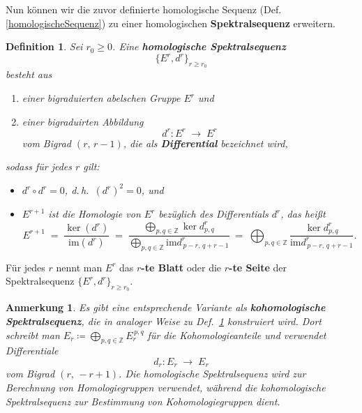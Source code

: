 \documentclass[12pt]{article}
\numberwithin{conj}{section}
\newtheorem{definition}[conj]{Definition}
\newtheorem{remark}[conj]{Anmerkung}
\newcommand{\Z}{\mathbb{Z}}
\begin{document}
    Nun können wir die zuvor definierte homologische Sequenz (Def. \ref{homologischeSequenz})
    zu einer homologischen \textbf{Spektralsequenz} erweitern.

    \begin{definition}
        \label{homologischeSpektraleSequenz} Sei $r_{0} \geq 0$. Eine \textbf{homologische
        Spektralsequenz}
        \[
            \{E^{r},d^{r}\}_{r \geq r_0}
        \]
        besteht aus
        \begin{enumerate}[nolistsep]
            \item einer bigraduierten abelschen Gruppe $E^{r}$ und

            \item einer bigraduirten Abbildung
                \[
                    d^{r} : E^{r} \;\longrightarrow\; E^{r}
                \]
                vom Bigrad $(r,\,r-1)$, die als \textbf{Differential} bezeichnet wird,
        \end{enumerate}
        sodass für jedes $r$ gilt:
        \begin{itemize}[nolistsep]
            \item $d^{r} \circ d^{r} = 0$, d.\,h.\ $(d^{r})^{2} = 0$, und

            \item $E^{r+1}$ ist die Homologie von $E^{r}$ bezüglich des Differentials $d
                ^{r}$, das heißt
                \[
                    E^{r+1}\;=\; \frac{\ker(d^{r})}{\mathrm{im}(d^{r})}\;=\; \frac{\displaystyle\bigoplus_{p,q
                    \in \Z}\ker d^{r}_{p,q} }%
                    {\displaystyle\bigoplus_{p,q \in \Z} \mathrm{im}\! d^r_{\,p-r,\,q+r-1} }
                    \;=\; \bigoplus_{p,q \in \Z}\frac{\ker d^{r}_{p,q} }{\mathrm{im}\! d^{r}_{\,p-r,\,q+r-1} }
                    .
                \]
        \end{itemize}
    \end{definition}

    Für jedes $r$ nennt man $E^{r}$ das \textbf{$r$-te Blatt} oder die \textbf{$r$-te
    Seite} der Spektralsequenz $\{E^{r},d^{r}\}_{r \geq r_0}$.

    \begin{remark}
        Es gibt eine entsprechende Variante als \textbf{kohomologische
        Spektralsequenz}, die in analoger Weise zu Def.~\ref{homologischeSpektraleSequenz}
        konstruiert wird. Dort schreibt man
        $E_{r} \coloneqq \bigoplus_{p,q \in \Z}E_{r}^{\,p,q}$ für die
        Kohomologieanteile und verwendet Differentiale
        \[
            d_{r} : E_{r} \;\longrightarrow\; E_{r}
        \]
        vom Bigrad $(r,\,-r+1)$. Die homologische Spektralsequenz wird zur Berechnung
        von Homologiegruppen verwendet, während die kohomologische Spektralsequenz
        zur Bestimmung von Kohomologiegruppen dient.
    \end{remark}
\end{document}
